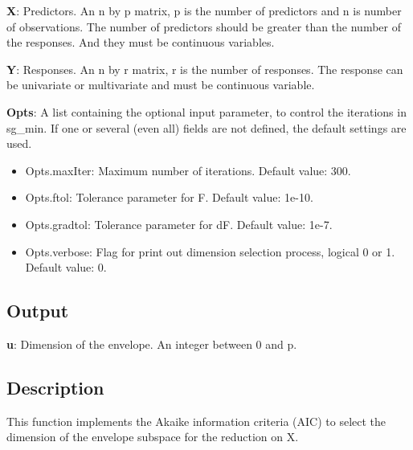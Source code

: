 \documentclass[a4paper,11pt,openany]{memoir}
\begin{document}
\begin{par}
\textbf{X}: Predictors. An n by p matrix, p is the number of predictors and n is number of observations. The number of predictors should be greater than the number of the responses. And they must be continuous variables.
\end{par} \vspace{1em}
\begin{par}
\textbf{Y}: Responses. An n by r matrix, r is the number of responses. The response can be univariate or multivariate and must be continuous variable.
\end{par} \vspace{1em}
\begin{par}
\textbf{Opts}: A list containing the optional input parameter, to control the iterations in sg\_min. If one or several (even all) fields are not defined, the default settings are used.
\end{par} \vspace{1em}
\begin{itemize}
\setlength{\itemsep}{-1ex}
   \item Opts.maxIter: Maximum number of iterations.  Default value: 300.
   \item Opts.ftol: Tolerance parameter for F.  Default value: 1e-10.
   \item Opts.gradtol: Tolerance parameter for dF.  Default value: 1e-7.
   \item Opts.verbose: Flag for print out dimension selection process, logical 0 or 1. Default value: 0.
\end{itemize}


\subsection*{Output}

\begin{par}
\textbf{u}: Dimension of the envelope. An integer between 0 and p.
\end{par} \vspace{1em}


\subsection*{Description}

\begin{par}
This function implements the Akaike information criteria (AIC) to select the dimension of the envelope subspace for the reduction on X.
\end{par} \vspace{1em}
\end{document}
